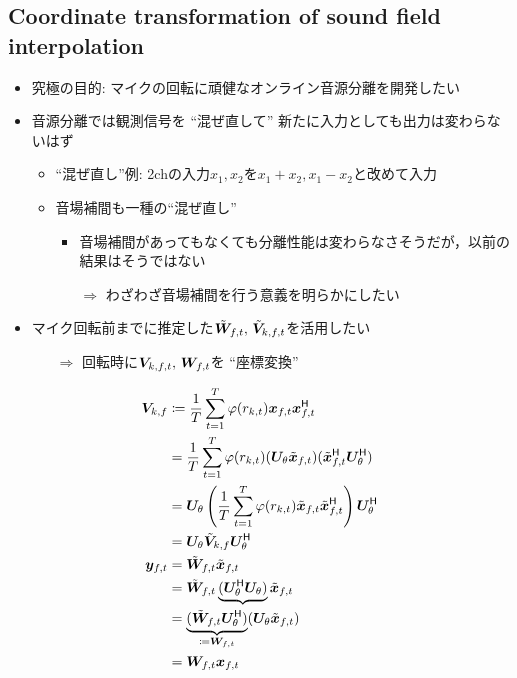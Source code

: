 \documentclass[sip,biber]{now-journal}
\begin{document}
\subsection{Coordinate transformation of sound field interpolation}
\begin{itemize}
  \item 究極の目的: マイクの回転に頑健なオンライン音源分離を開発したい
  \item 音源分離では観測信号を ``混ぜ直して'' 新たに入力としても出力は変わらないはず
    \begin{itemize}
      \item ``混ぜ直し''例: 2chの入力$x_1, x_2$を$x_1+x_2, x_1-x_2$と改めて入力
      \item 音場補間も一種の``混ぜ直し''
        \begin{itemize}
          \item 音場補間があってもなくても分離性能は変わらなさそうだが，以前の結果はそうではない
          \item[$\Rightarrow$] わざわざ音場補間を行う意義を明らかにしたい
        \end{itemize}
    \end{itemize}
  \item マイク回転前までに推定した$\irot{\Demix} _{\ft},\, \irot{\cov} _{\src,\ft}$を活用したい
    \begin{itemize}
      \item[$\Rightarrow$] 回転時に$\cov _{\src,\ft},\, \Demix _{\ft}$を ``座標変換''
    \end{itemize}
\end{itemize}
\begin{align}
  {\cov} _{\src,\freq} &\coloneqq \frac{1}{\Tframe} \sum _{\tframe = 1} ^{\Tframe} \weight (\var _{\src,\tframe}) \Obs _{\ft} \Obs _{\ft} ^{\hermite} \\
                       &= \frac{1}{\Tframe} \sum _{\tframe = 1} ^{\Tframe} \weight (\var _{\src,\tframe}) (\rotMat _{\rotDeg} \irot{\Obs} _{\ft}) (\irot{\Obs} _{\ft} ^{\hermite} \rotMat _{\rotDeg} ^{\hermite}) \\
                       &= \rotMat _{\rotDeg} \left(\frac{1}{\Tframe} \sum _{\tframe = 1} ^{\Tframe} \weight (\var _{\src,\tframe}) \irot{\Obs} _{\ft} \irot{\Obs} _{\ft} ^{\hermite}\right) \rotMat _{\rotDeg} ^{\hermite} \\
                       &= \rotMat _{\rotDeg} \irot{\cov} _{\src,\freq} \rotMat _{\rotDeg} ^{\hermite}
  \\
  \Est _{\ft} &= \irot{\Demix} _{\ft} \irot{\Obs} _{\ft} \\
              &= \irot{\Demix} _{\ft} \underbrace{(\rotMat _{\rotDeg} ^{\hermite} \rotMat _{\rotDeg})} \irot{\Obs} _{\ft} \\
              &= \underbrace{(\irot{\Demix} _{\ft} \rotMat _{\rotDeg} ^{\hermite})}_{\coloneqq \Demix _{\ft}} (\rotMat _{\rotDeg} \irot{\Obs} _{\ft}) \\
              &= \Demix _{\ft} \Obs _{\ft}
\end{align}
\end{document}
